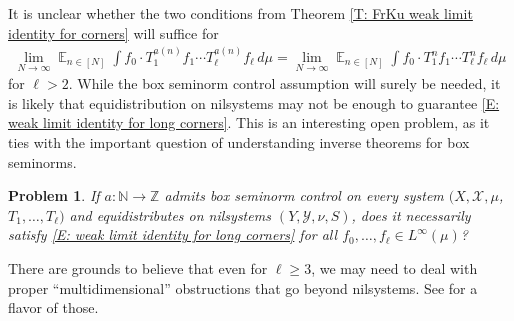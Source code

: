 \documentclass[11pt]{amsart}
\newtheorem{problem}{Problem}
\theoremstyle{definition}
\DeclareMathOperator*{\E}{\mathbb{E}}
\newcommand{\N}{{\mathbb N}}
\newcommand{\Z}{{\mathbb Z}}
\newcommand{\CX}{{\mathcal X}}
\newcommand{\CY}{{\mathcal Y}}
\newcommand{\1}{{\mathbf{1}}}
\begin{document}
It is unclear whether the two conditions from Theorem \ref{T: FrKu weak limit identity for corners} will suffice for
	\begin{align}\label{E: weak limit identity for long corners}
		\lim_{N\to\infty}\E_{n\in[N]}\int f_0\cdot T_1^{a(n)}f_1\cdots T_\ell^{a(n)}f_\ell \, d\mu = \lim_{N\to\infty}\E_{n\in[N]} \int f_0\cdot T_1^n f_1\cdots T_\ell^n f_\ell\, d\mu
	\end{align}
for $\ell>2$. While the box seminorm control assumption will surely be needed, it is likely that equidistribution on nilsystems may not be enough to guarantee \eqref{E: weak limit identity for long corners}. This is an interesting open problem, as it ties with the important question of understanding inverse theorems for box seminorms.
\begin{problem}
    If $a\colon \N\to\Z$ admits box seminorm control on every system $(X, \CX, \mu$, $T_1, \ldots, T_\ell)$ and equidistributes on nilsystems $(Y, \CY, \nu, S)$, does it necessarily satisfy \eqref{E: weak limit identity for long corners} for all $f_0, \ldots, f_\ell\in L^\infty(\mu)$?
\end{problem}
There are grounds to believe that even for $\ell\geq 3$, we may need to deal with proper ``multidimensional'' obstructions that go beyond nilsystems. See \cite[Theorem 3.5]{FrKu25} for a flavor of those.
\end{document}
